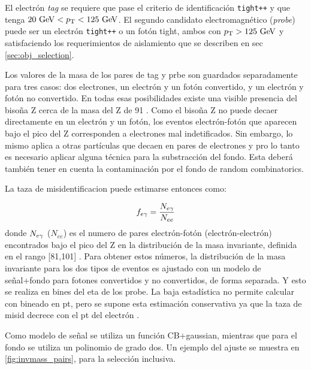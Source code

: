 El electrón \emph{tag} se requiere que pase el criterio de identificación \texttt{tight++}
y que tenga $20 \gev < \pt < 125 \gev$.
El segundo candidato electromagnético (\emph{probe}) puede ser un electrón \texttt{tight++}
o un fotón tight, ambos con $\pt > 125\gev$ y satisfaciendo los requerimientos de aislamiento
que se describen en sec \ref{sec:obj_selection}.

Los valores de la masa de los pares de tag y prbe son guardados separadamente para tres casos:
dos electrones, un electrón y un fotón convertido, y un electrón y fotón no convertido.
En todas esas posibilidades existe una visible presencia del bisoña Z cerca de la masa del Z de 91 \gev.
Como el bisoña Z no puede decaer directamente en un electrón y un fotón, los eventos electrón-fotón
que aparecen bajo el pico del Z corresponden a electrones mal indetificados. Sin embargo, lo mismo
aplica a otras partículas que decaen en pares de electrones y pro lo tanto es necesario aplicar alguna
técnica para la substracción del fondo. Esta deberá también tener en cuenta la contaminación por el
fondo de random combinatorics.

La taza de misidentificacion puede estimarse entonces como:

\begin{equation}\label{eq:efakerate}
  f_{e\gamma} = \frac{N_{e\gamma}}{N_{ee}}
\end{equation}
%
donde $N_{e\gamma}$ ($N_{ee}$) es el numero de pares electrón-fotón (electrón-electrón) encontrados
bajo el pico del Z en la distribución de la masa invariante, definida en el rango [81,101] \gev.
Para obtener estos números, la distribución de la masa invariante para los dos tipos de eventos
es ajustado con un modelo de señal+fondo para fotones convertidos y no convertidos, de forma
separada. Y esto se realiza en bines del eta de los probe. La baja estadística no permite calcular
con bineado en pt, pero se supone esta estimación conservativa ya que la taza de misid decrece con el pt
del electrón \cite{Kuhl:1604846}.

Como modelo de señal se utiliza un función CB+gaussian, mientras que para el fondo se utiliza un
polinomio de grado dos. Un ejemplo del ajuste se muestra en \cref{fig:invmass_pairs}, para
la selección inclusiva.

